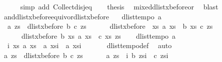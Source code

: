 \begin{isabellebody}
\ \ \ \ \isamarkupfalse%
\ {\isacharparenleft}simp\ add{\isacharcolon}\ Collect{\isacharunderscore}disj{\isacharunderscore}eq{\isacharparenright}\isanewline
\ \ \isamarkupfalse%
\ {\isacharquery}thesis\ \isamarkupfalse%
\ mixed{\isacharunderscore}dlist{\isacharunderscore}xbefore{\isacharunderscore}or{}\ \isamarkupfalse%
\ blast\isanewline
{}\isamarkupfalse%
%
\endisatagproof
{\isafoldproof}%
%
\isadelimproof
\isanewline
%
\endisadelimproof
\isanewline
{}\isamarkupfalse%
\ and{\isacharunderscore}dlist{\isacharunderscore}xbefore{\isacharunderscore}equiv{\isacharunderscore}or{\isacharunderscore}dlist{\isacharunderscore}xbefore{\isacharcolon}\ \isanewline
\ \ {\isachardoublequoteopen}dlist{\isacharunderscore}tempo{}\ a\ {\isasymLongrightarrow}\isanewline
\ \ {\isacharparenleft}a\ zs\ {\isasymand}\ dlist{\isacharunderscore}xbefore\ b\ c\ zs{\isacharparenright}\ {\isasymlongleftrightarrow}\ \isanewline
\ \ \ \ {\isacharparenleft}dlist{\isacharunderscore}xbefore\ {\isacharparenleft}{\isasymlambda}\ xs{\isachardot}\ a\ xs\ {\isasymand}\ b\ xs{\isacharparenright}\ c\ zs\ {\isasymor}\isanewline
\ \ \ \ \ \ dlist{\isacharunderscore}xbefore\ b\ {\isacharparenleft}{\isasymlambda}xs{\isachardot}\ a\ xs\ {\isasymand}\ c\ xs{\isacharparenright}\ zs{\isacharparenright}{\isachardoublequoteclose}\isanewline
%
\isadelimproof
%
\endisadelimproof
%
\isatagproof
{}\isamarkupfalse%
{\isacharminus}\isanewline
\ \ \isamarkupfalse%
\ {\isachardoublequoteopen}dlist{\isacharunderscore}tempo{}\ a{\isachardoublequoteclose}\isanewline
\ \ \isamarkupfalse%
\ {}{\isacharcolon}\ {\isachardoublequoteopen}{\isasymforall}i\ xs{\isachardot}\ a\ xs\ {\isasymlongleftrightarrow}\ {\isacharparenleft}a\ {\isacharparenleft}xs{\isasymdagger}{\isachardot}{\isachardot}i{\isacharparenright}\ {\isasymor}\ a\ {\isacharparenleft}xs{\isasymdagger}i{\isachardot}{\isachardot}{\isacharparenright}{\isacharparenright}{\isachardoublequoteclose}\ \isanewline
\ \ \ \ \isamarkupfalse%
\ dlist{\isacharunderscore}tempo{}{\isacharunderscore}def\ \isamarkupfalse%
\ auto\isanewline
\ \ \isamarkupfalse%
\ {\isachardoublequoteopen}a\ zs\ {\isasymand}\ dlist{\isacharunderscore}xbefore\ b\ c\ zs\ {\isasymlongleftrightarrow}\ \isanewline
\ \ \ \ a\ zs\ {\isasymand}\ {\isacharparenleft}{\isasymexists}i{\isachardot}\ b\ {\isacharparenleft}zs{\isasymdagger}{\isachardot}{\isachardot}i{\isacharparenright}\ {\isasymand}\ c\ {\isacharparenleft}zs{\isasymdagger}i{\isachardot}{\isachardot}{\isacharparenright}{\isacharparenright}{\isachardoublequoteclose}\isanewline

\end{isabellebody}
